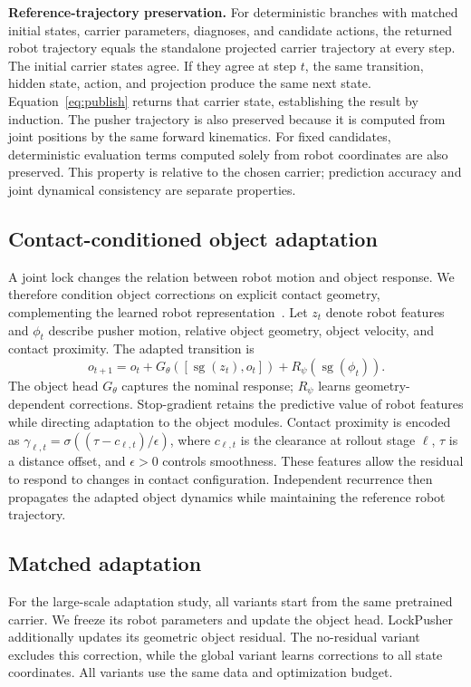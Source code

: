 \documentclass[conference]{IEEEtran}
\begin{document}
\textbf{Reference-trajectory preservation.} For deterministic branches with matched initial states, carrier parameters, diagnoses, and candidate actions, the returned robot trajectory equals the standalone projected carrier trajectory at every step. The initial carrier states agree. If they agree at step $t$, the same transition, hidden state, action, and projection produce the same next state. Equation~\eqref{eq:publish} returns that carrier state, establishing the result by induction. The pusher trajectory is also preserved because it is computed from joint positions by the same forward kinematics. For fixed candidates, deterministic evaluation terms computed solely from robot coordinates are also preserved. This property is relative to the chosen carrier; prediction accuracy and joint dynamical consistency are separate properties.

\subsection{Contact-conditioned object adaptation}
A joint lock changes the relation between robot motion and object response. We therefore condition object corrections on explicit contact geometry, complementing the learned robot representation~\cite{ajay2018augmenting,zhong2026activepusher}. Let $z_t$ denote robot features and $\phi_t$ describe pusher motion, relative object geometry, object velocity, and contact proximity. The adapted transition is
\begin{equation}
o_{t+1}=o_t+G_\theta([\operatorname{sg}(z_t),o_t])+R_\psi(\operatorname{sg}(\phi_t)).
\end{equation}
The object head $G_\theta$ captures the nominal response; $R_\psi$ learns geometry-dependent corrections. Stop-gradient retains the predictive value of robot features while directing adaptation to the object modules. Contact proximity is encoded as $\gamma_{\ell,t}=\sigma((\tau-c_{\ell,t})/\epsilon)$, where $c_{\ell,t}$ is the clearance at rollout stage $\ell$, $\tau$ is a distance offset, and $\epsilon>0$ controls smoothness. These features allow the residual to respond to changes in contact configuration. Independent recurrence then propagates the adapted object dynamics while maintaining the reference robot trajectory.



\subsection{Matched adaptation}
For the large-scale adaptation study, all variants start from the same pretrained carrier. We freeze its robot parameters and update the object head. LockPusher additionally updates its geometric object residual. The no-residual variant excludes this correction, while the global variant learns corrections to all state coordinates. All variants use the same data and optimization budget.
\end{document}
